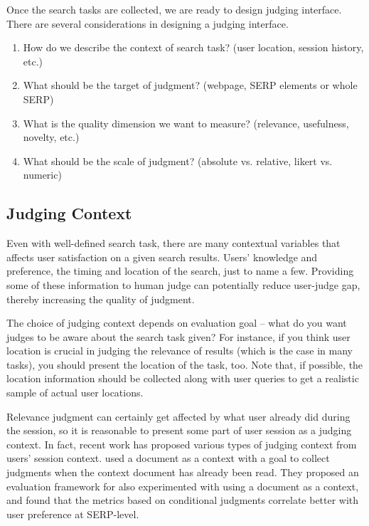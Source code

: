 \documentclass[openany]{now} %
\begin{document}
Once the search tasks are collected, we are ready to design judging interface. There are several considerations in designing a judging interface.

\begin{enumerate}
	\item  How do we describe the context of search task? (user location, session history, etc.)
	\item  What should be the target of judgment? (webpage, SERP elements or whole SERP)
	\item  What is the quality dimension we want to measure? (relevance, usefulness, novelty, etc.)
	\item  What should be the scale of judgment? (absolute vs. relative, likert vs. numeric)
\end{enumerate}

\subsection{Judging Context}
Even with well-defined search task, there are many contextual variables that affects user satisfaction on a given search results. Users' knowledge and preference, the timing and location of the search, just to name a few. Providing some of these information to human judge can potentially reduce user-judge gap, thereby increasing the quality of judgment. 

The choice of judging context depends on evaluation goal -- what do you want judges to be aware about the search task given? For instance, if you think user location is crucial in judging the relevance of results (which is the case in many tasks), you should present the location of the task, too. Note that, if possible, the location information should be collected along with user queries to get a realistic sample of actual user locations.

Relevance judgment can certainly get affected by what user already did during the session, so it is reasonable to present some part of user session as a judging context. In fact, recent work has proposed various types of judging context from users' session context. \cite{Chandar2013} used a document as a context with a goal to collect judgments when the context document has already been read. They proposed an evaluation framework for \cite{Golbus:2014:CDR} also experimented with using a document as a context, and found that the metrics based on conditional judgments correlate better with user preference at SERP-level.
\end{document}
